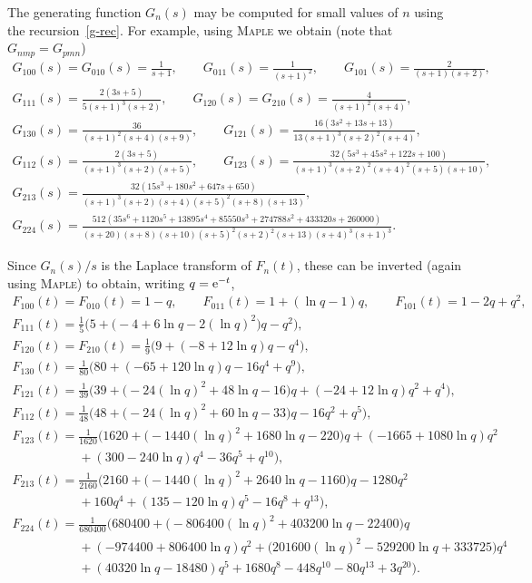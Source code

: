 \documentclass[pdftex]{sigma}
\theoremstyle{definition}
\begin{document}
The generating function $G_n(s)$ may be computed for small values of $n$ using the recursion~\eqref{g-rec}.
For example, using \textsc{Maple} we obtain (note that $G_{nmp}=G_{pmn}$)
\begin{gather*}
G_{100}(s)=G_{010}(s)=\frac1{s+1},\qquad
G_{011}(s)= \frac1{(s+1)^2},\qquad G_{101}(s)=\frac2{(s+1)(s+2)},\\
G_{111}(s)=\frac{2(3s+5)}{5(s+1)^3(s+2)},\qquad G_{120}(s)=G_{210}(s)=\frac{4}{(s+1)^2(s+4)},\\
G_{130}(s)=\frac{36}{(s+1)^2(s+4)(s+9)},\qquad
G_{121}(s)=\frac{16(3s^2+13s+13)}{13(s+1)^3(s+2)^2(s+4)},\\
G_{112}(s)=\frac{2(3s+5)}{(s+1)^3(s+2)(s+5)},\qquad
G_{123}(s)=\frac {32(5 {s}^{3}+45 {s}^{2}+122 s+100)}{ (s+1)^3(s+2)^2(s+4)^2(s+5)(s+10)},\\
G_{213}(s)=
\frac{32(15s^3 + 180s^2 + 647s + 650)}{(s + 1)^3(s + 2)(s + 4)(s + 5)^2(s + 8)(s + 13)},\\
G_{224}(s)=\frac{512(35s^6 + 1120s^5 + 13895s^4 + 85550s^3 + 274788s^2 + 433320s + 260000)}
{(s + 20)(s + 8)(s + 10)(s + 5)^2(s + 2)^2(s + 13)(s + 4)^3(s + 1)^3}.\end{gather*}

Since $G_n(s)/s$ is the Laplace transform of $F_n(t)$, these can be inverted (again using \textsc{Maple})
to obtain, writing $q={\rm e}^{-t}$,
\begin{gather}
F_{100}(t)=F_{010}(t)=1-q,\qquad
F_{011}(t)= 1+(\ln q-1)q,\qquad F_{101}(t)=1-2q+q^2,\label{f2}\\
F_{111}(t)=\frac15\big(5+\big(-4+6\ln q -2 ( \ln q )^2\big)q-q^2 \big),\nonumber \\
F_{120}(t)=F_{210}(t)=\frac19\big( 9 +(-8+12\ln q ) q -{q}^{4} \big),\nonumber \\
F_{130}(t)=\frac1{80}\big( 80+(-65+120\ln q) q -16 {q}^{4} +{q}^{9} \big),\nonumber \\
F_{121}(t)=\frac1{39}\big( 39 + \big(-24(\ln q)^2 + 48\ln q - 16\big) q + (-24 + 12\ln q)q^2 + q^4 \big),\nonumber \\
F_{112}(t)=\frac1{48}\big( 48 + \big(-24(\ln q)^2 + 60\ln q - 33\big) q - 16 q^2 + q^5 \big),\label{f112}
\\
F_{123}(t)=\frac1{1620} \big( 1620 + \big(-1440(\ln q)^2 + 1680\ln q - 220\big) q + (-1665 + 1080\ln q)q^2 \nonumber \\
\phantom{F_{123}(t)=}{} + (300 - 240\ln q)q^4 - 36q^5 + q^{10} \big),\label{f123}\\
F_{213}(t)= \frac1{2160}
\big( 2160 + \big(-1440(\ln q)^2 + 2640\ln q - 1160\big) q - 1280q^2\nonumber\\
\phantom{F_{213}(t)=}{} + 160 q^4 + (135 - 120\ln q) q^5 - 16 q^8 + q^{13} \big),\label{f213}
\\
F_{224}(t)= \frac1{680400}
\big( 680400 + \big(-806400(\ln q)^2 + 403200 \ln q - 22400\big) q \nonumber\\
\phantom{F_{224}(t)=}{} + (-974400 + 806400\ln q)q^2 + \big(201600(\ln q)^2 - 529200\ln q + 333725\big) q^4 \nonumber\\
\phantom{F_{224}(t)=}{} + (40320\ln q - 18480)q^5 + 1680q^8 - 448q^{10} - 80q^{13}+3q^{20} \big).\label{f224}
\end{gather}
\end{document}
